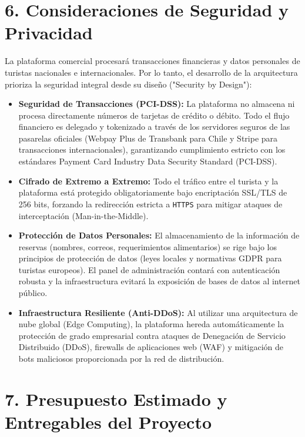 \documentclass[11pt,a4paper]{article}
\begin{document}
\section{6. Consideraciones de Seguridad y Privacidad}

La plataforma comercial procesará transacciones financieras y datos personales de turistas nacionales e internacionales. Por lo tanto, el desarrollo de la arquitectura prioriza la seguridad integral desde su diseño ("Security by Design"):

\begin{itemize}
    \item \textbf{Seguridad de Transacciones (PCI-DSS):} La plataforma no almacena ni procesa directamente números de tarjetas de crédito o débito. Todo el flujo financiero es delegado y tokenizado a través de los servidores seguros de las pasarelas oficiales (Webpay Plus de Transbank para Chile y Stripe para transacciones internacionales), garantizando cumplimiento estricto con los estándares Payment Card Industry Data Security Standard (PCI-DSS).
    \item \textbf{Cifrado de Extremo a Extremo:} Todo el tráfico entre el turista y la plataforma está protegido obligatoriamente bajo encriptación SSL/TLS de 256 bits, forzando la redirección estricta a \texttt{HTTPS} para mitigar ataques de interceptación (Man-in-the-Middle).
    \item \textbf{Protección de Datos Personales:} El almacenamiento de la información de reservas (nombres, correos, requerimientos alimentarios) se rige bajo los principios de protección de datos (leyes locales y normativas GDPR para turistas europeos). El panel de administración contará con autenticación robusta y la infraestructura evitará la exposición de bases de datos al internet público.
    \item \textbf{Infraestructura Resiliente (Anti-DDoS):} Al utilizar una arquitectura de nube global (Edge Computing), la plataforma hereda automáticamente la protección de grado empresarial contra ataques de Denegación de Servicio Distribuido (DDoS), firewalls de aplicaciones web (WAF) y mitigación de bots maliciosos proporcionada por la red de distribución.
\end{itemize}

\section{7. Presupuesto Estimado y Entregables del Proyecto}
\end{document}
